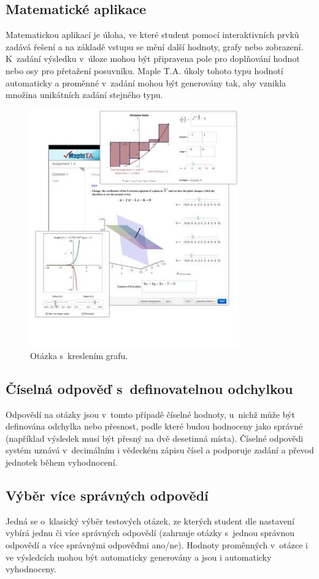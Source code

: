 \documentclass[
print,
  11pt,
  table,   
  nolof,    
  nolot,
  oneside,final
]{fithesis3}
\begin{document}
	\subsection{Matematické aplikace}
Matematickou aplikací je úloha, ve které student pomocí interaktivních prv\-ků zadává řešení a na základě vstupu se mění další hodnoty, grafy nebo zobrazení. K~zadání výsledku v~úloze mohou být připravena pole pro doplňování hodnot nebo osy pro přetažení posuvníku. Maple T.A. úkoly tohoto typu hodnotí automaticky a proměnné v~zadání mohou být generovány tak, aby vznikla množina unikátních zadání stejného typu.
		\begin{figure}[hbt]
		  \begin{center}
		    \includegraphics[width=90mm]{images/MapleTA_math.png}
		   \end{center}
		  \caption{Otázka s~kreslením grafu.  \cite{maple-question}}
		  \label{fig:maplemath}
		\end{figure}

	\subsection{Číselná odpověď s~definovatelnou odchylkou}
Odpovědí na otázky jsou v~tomto případě číselné hodnoty, u~nichž může být definována odchylka nebo přesnost, podle které budou hodnoceny jako správné (například výsledek musí být přesný na dvě desetinná místa). Číselné odpovědi systém uznává v~decimálním i vědeckém zápisu čísel a podporuje zadání a převod jednotek během vyhodnocení.

	\subsection{Výběr více správných odpovědí}
Jedná se o~klasický výběr testových otázek, ze kterých student dle nastavení vybírá jednu či více správných odpovědí (zahrnuje otázky s~jednou správnou odpovědí a více správnými odpověďmi ano/ne). Hodnoty proměnných v~otázce i ve výsledcích mohou být automaticky generovány a jsou i automaticky vyhodnoceny.
\end{document}
